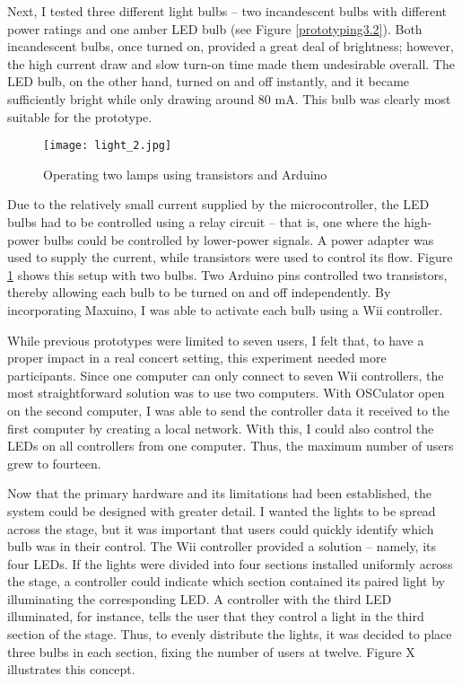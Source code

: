 Next, I tested three different light bulbs -- two incandescent bulbs with different power ratings and one amber LED bulb (see Figure \ref{prototyping3.2}). Both incandescent bulbs, once turned on, provided a great deal of brightness; however, the high current draw and slow turn-on time made them undesirable overall. The LED bulb, on the other hand, turned on and off instantly, and it became sufficiently bright while only drawing around 80 mA. This bulb was clearly most suitable for the prototype.

\begin{figure}
	\centering

	\texttt{[image: light\_2.jpg]}
	\caption{Operating two lamps using transistors and Arduino}

	\label{prototyping3.3}
\end{figure}

Due to the relatively small current supplied by the microcontroller, the LED bulbs had to be controlled using a relay circuit -- that is, one where the high-power bulbs could be controlled by lower-power signals. A power adapter was used to supply the current, while transistors were used to control its flow. Figure \ref{prototyping3.3} shows this setup with two bulbs. Two Arduino pins controlled two transistors, thereby allowing each bulb to be turned on and off independently. By incorporating Maxuino, I was able to activate each bulb using a Wii controller.

While previous prototypes were limited to seven users, I felt that, to have a proper impact in a real concert setting, this experiment needed more participants. Since one computer can only connect to seven Wii controllers, the most straightforward solution was to use two computers. With OSCulator open on the second computer, I was able to send the controller data it received to the first computer by creating a local network. With this, I could also control the LEDs on all controllers from one computer. Thus, the maximum number of users grew to fourteen.


Now that the primary hardware and its limitations had been established, the system could be designed with greater detail. I wanted the lights to be spread across the stage, but it was important that users could quickly identify which bulb was in their control. The Wii controller provided a solution -- namely, its four LEDs. If the lights were divided into four sections installed uniformly across the stage, a controller could indicate which section contained its paired light by illuminating the corresponding LED. A controller with the third LED illuminated, for instance, tells the user that they control a light in the third section of the stage. Thus, to evenly distribute the lights, it was decided to place three bulbs in each section, fixing the number of users at twelve. Figure X illustrates this concept.


